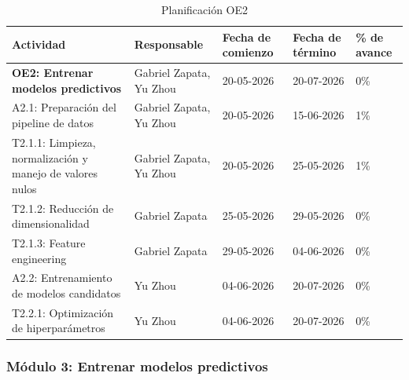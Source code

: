 \documentclass[12pt,a4paper]{article}
\begin{document}
    \begin{table}[H]
            \centering
            \renewcommand{\arraystretch}{1.5}
            \begin{tabular}{|p{5cm}|p{3cm}|p{2cm}|p{2cm}|p{2cm}|}
            \hline
            \textbf{Actividad} & \textbf{Responsable} & \textbf{Fecha de comienzo} & \textbf{Fecha de término} & \textbf{\% de avance} \\ \hline
            \textbf{OE2: Entrenar modelos predictivos} & Gabriel Zapata, Yu Zhou & 20-05-2026 & 20-07-2026 & 0\% \\ \hline
            A2.1: Preparación del pipeline de datos & Gabriel Zapata, Yu Zhou & 20-05-2026 & 15-06-2026 & 1\% \\ \hline
            T2.1.1: Limpieza, normalización y manejo de valores nulos & Gabriel Zapata, Yu Zhou & 20-05-2026 & 25-05-2026 & 1\% \\ \hline
            T2.1.2: Reducción de dimensionalidad & Gabriel Zapata & 25-05-2026 & 29-05-2026 & 0\% \\ \hline
            T2.1.3: Feature engineering & Gabriel Zapata & 29-05-2026 & 04-06-2026 & 0\% \\ \hline
            A2.2: Entrenamiento de modelos candidatos & Yu Zhou & 04-06-2026 & 20-07-2026 & 0\% \\ \hline
            T2.2.1: Optimización de hiperparámetros & Yu Zhou & 04-06-2026 & 20-07-2026 & 0\% \\ \hline
            \end{tabular}
            \caption{Planificación OE2}
            \label{tab:planificacion_avance_oe2}
    \end{table}




    \subsubsection{Módulo 3: Entrenar modelos predictivos}
\end{document}

